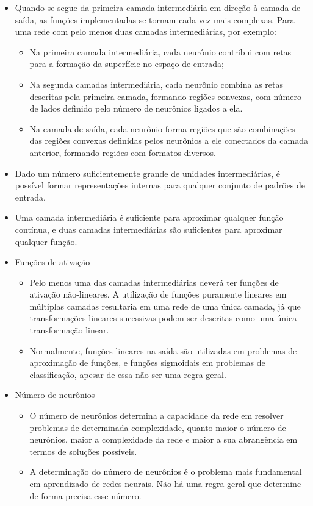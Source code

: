 \documentclass{article}
\begin{document}
\begin{itemize}
		\item Quando se segue da primeira camada intermediária em direção à camada de saída, as funções implementadas se tornam cada vez mais complexas. Para uma rede com pelo menos duas camadas intermediárias, por exemplo:
		\begin{itemize}
			\item Na primeira camada intermediária, cada neurônio contribui com retas para a formação da superfície no espaço de entrada;
			\item Na segunda camadas intermediária, cada neurônio combina as retas descritas pela primeira camada, formando regiões convexas, com número de lados definido pelo número de neurônios ligados a ela.
			\item Na camada de saída, cada neurônio forma regiões que são combinações das regiões convexas definidas pelos neurônios a ele conectados da camada anterior, formando regiões com formatos diversos.
		\end{itemize}
		\item Dado um número suficientemente grande de unidades intermediárias, é possível formar representações internas para qualquer conjunto de padrões de entrada.
		\item Uma camada intermediária é suficiente para aproximar qualquer função contínua, e duas camadas intermediárias são suficientes para aproximar qualquer função.
		\item Funções de ativação
		\begin{itemize}
			\item Pelo menos uma das camadas intermediárias deverá ter funções de ativação não-lineares. A utilização de funções puramente lineares em múltiplas camadas resultaria em uma rede de uma única camada, já que transformações lineares sucessivas podem ser descritas como uma única transformação linear.
			\item Normalmente, funções lineares na saída são utilizadas em problemas de aproximação de funções, e funções sigmoidais em problemas de classificação, apesar de essa não ser uma regra geral.
		\end{itemize}
		\item Número de neurônios
		\begin{itemize}
			\item O número de neurônios determina a capacidade da rede em resolver problemas de determinada complexidade, quanto maior o número de neurônios, maior a complexidade da rede e maior a sua abrangência em termos de soluções possíveis.
			\item A determinação do número de neurônios é o problema mais fundamental em aprendizado de redes neurais. Não há uma regra geral que determine de forma precisa esse número.

\end{itemize}
\end{itemize}
\end{document}
